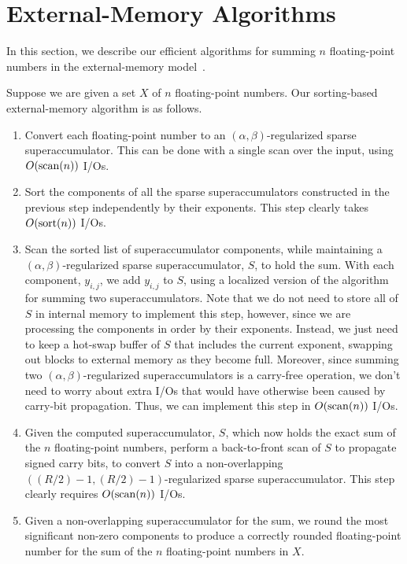 \documentclass[11pt]{article}
\begin{document}
\section{External-Memory Algorithms}
In this section, we describe our efficient algorithms
for summing $n$ floating-point numbers in the 
external-memory model~\cite{Vitter:2008}.

Suppose we are given a set $X$ of $n$ floating-point numbers.
Our sorting-based external-memory algorithm is as follows.
\begin{enumerate}
\item
Convert each floating-point number to an 
$(\alpha,\beta)$-regularized sparse superaccumulator. This can be
done with a single scan over the input, using 
$O({\rm scan}(n))$ I/Os.
\item
Sort the components of all the sparse superaccumulators
constructed in the previous step
independently by their exponents.
This step clearly takes $O({\rm sort}(n))$ I/Os.
\item
Scan the sorted list of superaccumulator components, while
maintaining a $(\alpha,\beta)$-regularized sparse superaccumulator, $S$, to
hold the sum.  
With each component, $y_{i,j}$, we add $y_{i,j}$ to $S$, using a
localized version of the algorithm for summing two superaccumulators.
Note that we do not need to store all of $S$ in internal memory to
implement this step, however,
since we are processing the components in order by their exponents.
Instead, we just need to keep a hot-swap buffer of $S$ that includes the
current exponent, swapping out blocks to external memory as they become full. 
Moreover, since summing two $(\alpha,\beta)$-regularized
superaccumulators is a carry-free operation, we don't need to worry
about extra I/Os 
that would have otherwise been caused by carry-bit propagation.
Thus, we can implement this step in $O({\rm scan}(n))$ I/Os.
\item
Given the computed superaccumulator, $S$, which now holds the exact
sum of the $n$ floating-point numbers, perform a
back-to-front scan of $S$ to propagate signed carry bits, to convert
$S$ into a non-overlapping $((R/2)-1,(R/2)-1)$-regularized sparse
superaccumulator.
This step clearly requires $O({\rm scan}(n))$ I/Os.
\item
Given a non-overlapping superaccumulator for the sum, we round the
most significant non-zero components to produce a correctly rounded
floating-point number for the sum of the $n$ floating-point numbers
in $X$.
\end{enumerate}
\end{document}
